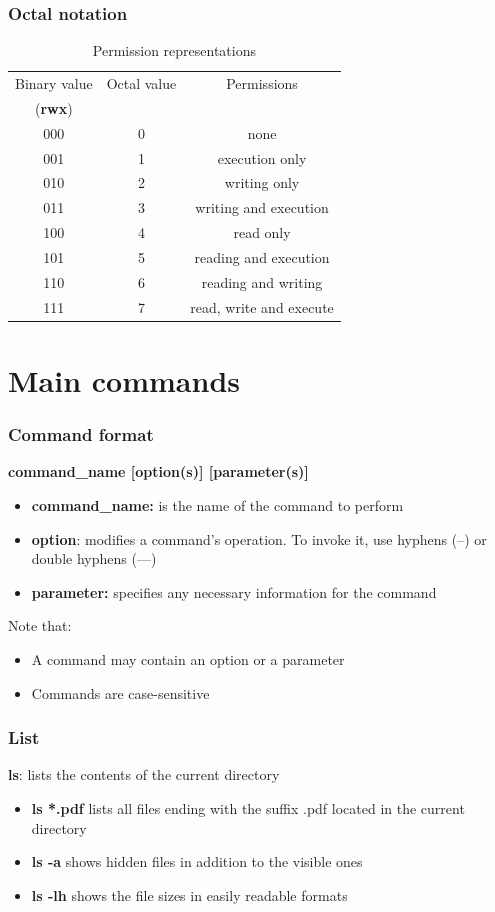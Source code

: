 \documentclass{beamer}
\begin{document}
\begin{frame}
\frametitle{Octal notation}
\begin{table}[!h]
\begin{center}
\begin{tabular}{ ccc } 
\hline
Binary value & Octal value & Permissions \\
(\textbf{rwx}) & & \\
\hline
000 & 0 & none \\
001 & 1 & execution only \\
010 & 2 & writing only \\
011 & 3 & writing and execution \\
100 & 4 & read only \\
101 & 5 & reading and execution \\
110 & 6 & reading and writing \\
111 & 7 & read, write and execute \\
\hline
\end{tabular}
\caption{Permission representations}
\end{center}
\end{table}
\end{frame}

\section{Main commands}
\begin{frame}
\frametitle{Command format}
\textbf{command\_name [option(s)] [parameter(s)]}
\begin{itemize}
\item \textbf{command\_name:} is the name of the command to perform
\item \textbf{option}: modifies a command’s operation. To invoke it, use hyphens (–) or double hyphens (—)
\item \textbf{parameter:} specifies any necessary information for the command
\end{itemize}

Note that:
\begin{itemize}
\item A command may contain an option or a parameter
\item Commands are case-sensitive
\end{itemize}
\end{frame}

\begin{frame}
\frametitle{List}
\textbf{ls}: lists the contents of the current directory
\newline
\begin{example}
\begin{itemize}
\item \textbf{ls *.pdf} lists all files ending with the suffix .pdf located in the current directory
\item \textbf{ls -a} shows hidden files in addition to the visible ones
\item \textbf{ls -lh} shows the file sizes in easily readable formats
\end{itemize}
\end{example}
\end{frame}
\end{document}
